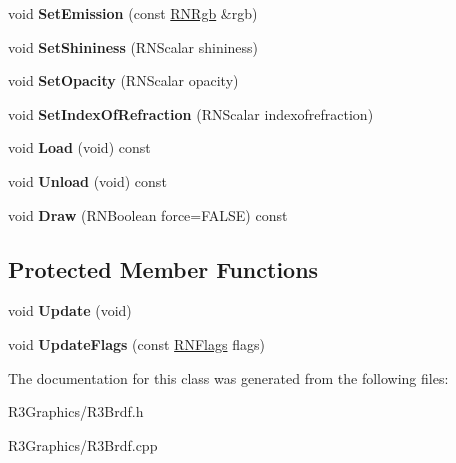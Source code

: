 \begin{DoxyCompactItemize}
\item 
void {\bfseries Set\+Emission} (const \hyperlink{class_r_n_rgb}{R\+N\+Rgb} \&rgb)\hypertarget{class_r3_brdf_ac8ff611cf31bbe3795cd9783ac5fa833}{}\label{class_r3_brdf_ac8ff611cf31bbe3795cd9783ac5fa833}

\item 
void {\bfseries Set\+Shininess} (R\+N\+Scalar shininess)\hypertarget{class_r3_brdf_a8842037800a27d1e58cb72b150e0bda9}{}\label{class_r3_brdf_a8842037800a27d1e58cb72b150e0bda9}

\item 
void {\bfseries Set\+Opacity} (R\+N\+Scalar opacity)\hypertarget{class_r3_brdf_acd714a50ea69a513328567d1618ebe9c}{}\label{class_r3_brdf_acd714a50ea69a513328567d1618ebe9c}

\item 
void {\bfseries Set\+Index\+Of\+Refraction} (R\+N\+Scalar indexofrefraction)\hypertarget{class_r3_brdf_aaeed62c18c0eb91a5a15b9c45d4f4b1c}{}\label{class_r3_brdf_aaeed62c18c0eb91a5a15b9c45d4f4b1c}

\item 
void {\bfseries Load} (void) const \hypertarget{class_r3_brdf_af93330f6469a4c800f42a056a15655f5}{}\label{class_r3_brdf_af93330f6469a4c800f42a056a15655f5}

\item 
void {\bfseries Unload} (void) const \hypertarget{class_r3_brdf_ac2aa39a75a3aacb6f966fc96a977ed21}{}\label{class_r3_brdf_ac2aa39a75a3aacb6f966fc96a977ed21}

\item 
void {\bfseries Draw} (R\+N\+Boolean force=F\+A\+L\+SE) const \hypertarget{class_r3_brdf_a3c495da11bb530dc8c4dae2420c7e888}{}\label{class_r3_brdf_a3c495da11bb530dc8c4dae2420c7e888}

\end{DoxyCompactItemize}
\subsection*{Protected Member Functions}
\begin{DoxyCompactItemize}
\item 
void {\bfseries Update} (void)\hypertarget{class_r3_brdf_a7012a3fbcb6b610dcb6f6ca66e818ffc}{}\label{class_r3_brdf_a7012a3fbcb6b610dcb6f6ca66e818ffc}

\item 
void {\bfseries Update\+Flags} (const \hyperlink{class_r_n_flags}{R\+N\+Flags} flags)\hypertarget{class_r3_brdf_a7aa847654676680c2aa7f4bdffeb0051}{}\label{class_r3_brdf_a7aa847654676680c2aa7f4bdffeb0051}

\end{DoxyCompactItemize}


The documentation for this class was generated from the following files\+:\begin{DoxyCompactItemize}
\item 
R3\+Graphics/R3\+Brdf.\+h\item 
R3\+Graphics/R3\+Brdf.\+cpp\end{DoxyCompactItemize}
